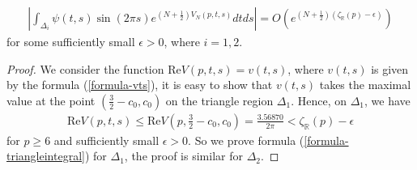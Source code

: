 \documentclass[12pt]{amsart}
\begin{document}
\begin{lemma} \label{lemma-triangleintegral}
\begin{align} \label{formula-triangleintegral}
|\int_{\Delta_i}\psi(t,s)\sin(2\pi s)e^{(N+\frac{1}{2})V_N(p,t,s)}dtds|=O\left(e^{(N+\frac{1}{2})(\zeta_{\mathbb{R}}(p)-\epsilon)}\right)     
\end{align}
for some sufficiently small $\epsilon>0$, where $i=1,2$. 
\end{lemma}
\begin{proof}
We consider the function $\text{Re} V(p,t,s)=v(t,s)$, where $v(t,s)$ is given by the formula (\ref{formula-vts}), it is easy to show that $v(t,s)$ takes the maximal value at the point $(\frac{3}{2}-c_0,c_0)$ on the triangle region $\Delta_{1}$. Hence, on $\Delta_1$,  we have
\begin{align}
    \text{Re}V(p,t,s)\leq \text{Re}V\left(p,\frac{3}{2}-c_0,c_0\right)=\frac{3.56870}{2\pi}<\zeta_{\mathbb{R}}(p)-\epsilon
\end{align}
for $p\geq 6$ and sufficiently small $\epsilon>0$.
So we prove formula (\ref{formula-triangleintegral}) for $\Delta_1$, the proof is similar for $\Delta_2$.  
\end{proof}
\end{document}
